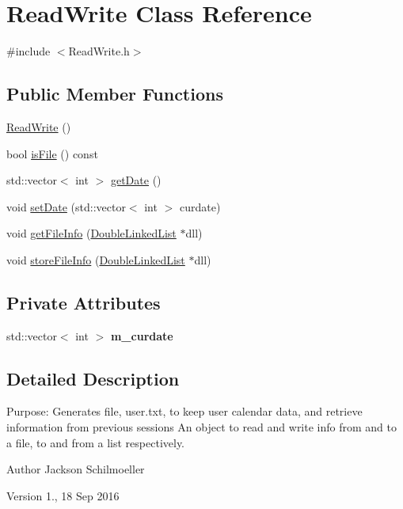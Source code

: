 \hypertarget{classReadWrite}{\section{Read\-Write Class Reference}
\label{classReadWrite}
}


{\ttfamily \#include $<$Read\-Write.\-h$>$}

\subsection*{Public Member Functions}
\begin{DoxyCompactItemize}
\item 
\hyperlink{classReadWrite_a11c22591e481ff4fc111e485ab2955c2}{Read\-Write} ()
\item 
bool \hyperlink{classReadWrite_a82950d962ae4e05f04772b82b6690670}{is\-File} () const 
\item 
std\-::vector$<$ int $>$ \hyperlink{classReadWrite_af7557737b9043d9e605473c7e6984046}{get\-Date} ()
\item 
void \hyperlink{classReadWrite_a22a0b16f5004c059980424203c84978a}{set\-Date} (std\-::vector$<$ int $>$ curdate)
\item 
void \hyperlink{classReadWrite_a778d106489a4f41730d902d338ec3937}{get\-File\-Info} (\hyperlink{classDoubleLinkedList}{Double\-Linked\-List} $\ast$dll)
\item 
void \hyperlink{classReadWrite_a323d8e4f3bf72f0ef4726b3c08f0f4c3}{store\-File\-Info} (\hyperlink{classDoubleLinkedList}{Double\-Linked\-List} $\ast$dll)
\end{DoxyCompactItemize}
\subsection*{Private Attributes}
\begin{DoxyCompactItemize}
\item 
\hypertarget{classReadWrite_a3ce1dfd90cd2fca6ae783b0b4c02421a}{std\-::vector$<$ int $>$ {\bfseries m\-\_\-curdate}}\label{classReadWrite_a3ce1dfd90cd2fca6ae783b0b4c02421a}

\end{DoxyCompactItemize}


\subsection{Detailed Description}
Purpose\-: Generates file, user.\-txt, to keep user calendar data, and retrieve information from previous sessions An object to read and write info from and to a file, to and from a list respectively. \begin{DoxyAuthor}{Author}
Jackson Schilmoeller 
\end{DoxyAuthor}
\begin{DoxyVersion}{Version}
1., 18 Sep 2016 
\end{DoxyVersion}


